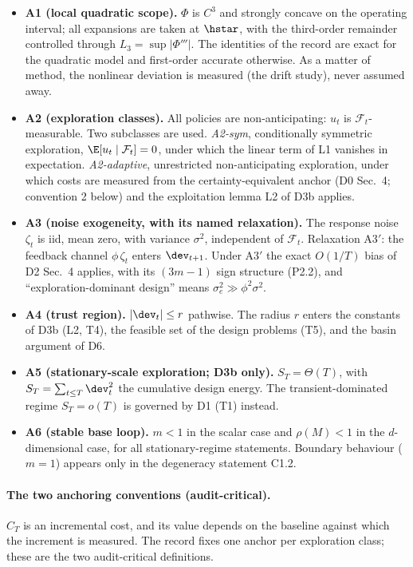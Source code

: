 \begin{itemize}
\item \textbf{A1 (local quadratic scope).} $\Phi$ is $C^3$ and strongly
concave on the operating interval; all expansions are taken at $\hstar$, with
the third-order remainder controlled through $L_3 = \sup \lvert \Phi'''
\rvert$. The identities of the record are exact for the quadratic model and
first-order accurate otherwise. As a matter of method, the nonlinear
deviation is measured (the drift study), never assumed away.
\item \textbf{A2 (exploration classes).} All policies are non-anticipating:
$u_t$ is $\mathcal{F}_t$-measurable. Two subclasses are used.
\emph{A2-sym}, conditionally symmetric exploration,
$\E[u_t \mid \mathcal{F}_t] = 0$, under which the linear term of L1 vanishes
in expectation. \emph{A2-adaptive}, unrestricted non-anticipating
exploration, under which costs are measured from the certainty-equivalent
anchor (D0 Sec.~4; convention 2 below) and the exploitation lemma L2 of D3b
applies.
\item \textbf{A3 (noise exogeneity, with its named relaxation).} The
response noise $\zeta_t$ is iid, mean zero, with variance $\sigma^2$,
independent of $\mathcal{F}_t$. Relaxation A3$'$: the feedback channel
$\phi\,\zeta_t$ enters $\dev_{t+1}$. Under A3$'$ the exact $O(1/T)$ bias of
D2 Sec.~4 applies, with its $(3m-1)$ sign structure (P2.2), and
``exploration-dominant design'' means $\sigma_e^2 \gg \phi^2 \sigma^2$.
\item \textbf{A4 (trust region).} $\lvert \dev_t \rvert \le r$ pathwise.
The radius $r$ enters the constants of D3b (L2, T4), the feasible set of
the design problems (T5), and the basin argument of D6.
\item \textbf{A5 (stationary-scale exploration; D3b only).}
$S_T = \Theta(T)$, with $S_T = \sum_{t \le T} \dev_t^2$ the cumulative
design energy. The transient-dominated regime $S_T = o(T)$ is governed by
D1 (T1) instead.
\item \textbf{A6 (stable base loop).} $m < 1$ in the scalar case and
$\rho(M) < 1$ in the $d$-dimensional case, for all stationary-regime
statements. Boundary behaviour ($m = 1$) appears only in the degeneracy
statement C1.2.
\end{itemize}

\paragraph{The two anchoring conventions (audit-critical).}
$C_T$ is an incremental cost, and its value depends on the baseline against
which the increment is measured. The record fixes one anchor per exploration
class; these are the two audit-critical definitions.

